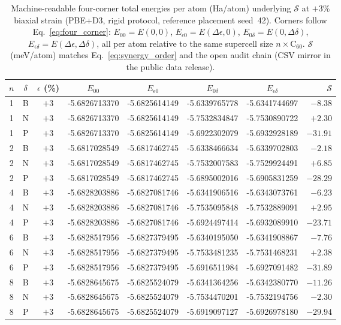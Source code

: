 \begin{table}[t]
\caption{\label{tab:S_corners}Machine-readable four-corner total energies per atom (Ha/atom) underlying $\mathcal{S}$ at $+3$\% biaxial strain (PBE+D3, rigid protocol, reference placement seed~42).
Corners follow Eq.~\eqref{eq:four_corner}: $E_{00}=E(0,0)$, $E_{\epsilon 0}=E(\Delta\epsilon,0)$, $E_{0\delta}=E(0,\Delta\delta)$, $E_{\epsilon\delta}=E(\Delta\epsilon,\Delta\delta)$, all per atom relative to the same supercell size $n\times\mathrm{C}_{60}$.
$\mathcal{S}$ (meV/atom) matches Eq.~\eqref{eq:synergy_order} and the open audit chain (CSV mirror in the public data release).}
\begin{ruledtabular}
\footnotesize
\begin{tabular}{cccccccr}
$n$ & $\delta$ & $\epsilon$ (\%) & $E_{00}$ & $E_{\epsilon 0}$ & $E_{0\delta}$ & $E_{\epsilon\delta}$ & $\mathcal{S}$ \\
\hline
1 & B & $+3$ & -5.6826713370 & -5.6825614149 & -5.6339765778 & -5.6341744697 & $-8.38$ \\
1 & N & $+3$ & -5.6826713370 & -5.6825614149 & -5.7532834847 & -5.7530890722 & $+2.30$ \\
1 & P & $+3$ & -5.6826713370 & -5.6825614149 & -5.6922302079 & -5.6932928189 & $-31.91$ \\
2 & B & $+3$ & -5.6817028549 & -5.6817462745 & -5.6338466634 & -5.6339702803 & $-2.18$ \\
2 & N & $+3$ & -5.6817028549 & -5.6817462745 & -5.7532007583 & -5.7529924491 & $+6.85$ \\
2 & P & $+3$ & -5.6817028549 & -5.6817462745 & -5.6895002016 & -5.6905831259 & $-28.29$ \\
4 & B & $+3$ & -5.6828203886 & -5.6827081746 & -5.6341906516 & -5.6343073761 & $-6.23$ \\
4 & N & $+3$ & -5.6828203886 & -5.6827081746 & -5.7535095848 & -5.7532889091 & $+2.95$ \\
4 & P & $+3$ & -5.6828203886 & -5.6827081746 & -5.6924497414 & -5.6932089910 & $-23.71$ \\
6 & B & $+3$ & -5.6828517956 & -5.6827379495 & -5.6340195050 & -5.6341908867 & $-7.76$ \\
6 & N & $+3$ & -5.6828517956 & -5.6827379495 & -5.7533481235 & -5.7531468231 & $+2.38$ \\
6 & P & $+3$ & -5.6828517956 & -5.6827379495 & -5.6916511984 & -5.6927091482 & $-31.89$ \\
8 & B & $+3$ & -5.6828645675 & -5.6825524079 & -5.6341364256 & -5.6342380770 & $-11.26$ \\
8 & N & $+3$ & -5.6828645675 & -5.6825524079 & -5.7534470201 & -5.7532194756 & $-2.30$ \\
8 & P & $+3$ & -5.6828645675 & -5.6825524079 & -5.6919097127 & -5.6926978180 & $-29.94$ \\
\end{tabular}
\end{ruledtabular}
\end{table}
